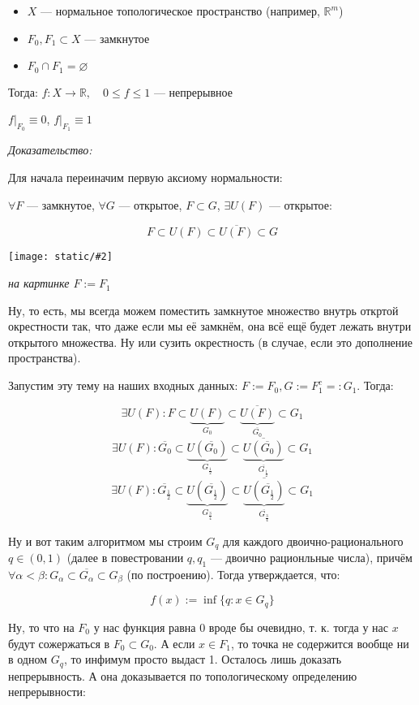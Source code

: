 \documentclass{article}
\def\images#1#2{\begin{center}\texttt{[image: static/\#2]}\end{center}}
\begin{document}
\begin{itemize}
    \item $X$ --- нормальное топологическое пространство (например, $\mathbb{R}^m$)
    \item $F_0, F_1 \subset X$ --- замкнутое
    \item $F_0 \cap F_1 = \varnothing$
\end{itemize}

Тогда: $f: X \rightarrow \mathbb{R}, \quad 0 \le f \le 1$ --- непрерывное

$f|_{F_0} \equiv 0$, $f|_{F_1} \equiv 1$

\textit{Доказательство:}

Для начала переиначим первую аксиому нормальности: 

$\forall F$ --- замкнутое, $\forall G$ --- открытое, $F \subset G$, $\exists U(F)$ --- открытое: 

\[F \subset U(F) \subset \overline{U(F)} \subset G\]

\images{0.5}{uryhson.jpg}

\textit{на картинке $F := F_1$}

Ну, то есть, мы всегда можем поместить замкнутое множество внутрь откртой окрестности так, что даже если мы её замкнём, она всё ещё будет лежать внутри открытого множества. Ну или сузить окрестность (в случае, если это дополнение пространства).

Запустим эту тему на наших входных данных: $F := F_0, G := F^c_1 =: G_1$. Тогда:

\[\exists U(F): F \subset \underbrace{U(F)}_{G_0} \subset \underbrace{\overline{U(F)}}_{\overline{G_0}} \subset G_1\]
\[\exists U(F): \overline{G_0} \subset \underbrace{U(\overline{G_0})}_{G_{\frac{1}{2}}} \subset \underbrace{\overline{U(\overline{G_0})}}_{\overline{G_{\frac{1}{2}}}} \subset G_1\]
\[\exists U(F): \overline{G_{\frac{1}{2}}} \subset \underbrace{U(\overline{G_{\frac{1}{2}}})}_{G_{\frac{3}{4}}} \subset \underbrace{\overline{U(\overline{G_{\frac{1}{2}}})}}_{\overline{G_{\frac{3}{4}}}} \subset G_1\]

Ну и вот таким алгоритмом мы строим $G_q$ для каждого двоично-рационального $q \in (0, 1)$ (далее в повестровании $q, q_1$ --- двоично рационльные числа), причём $\forall \alpha < \beta: G_{\alpha} \subset \overline{G_{\alpha}} \subset G_{\beta}$ (по построению). Тогда утверждается, что:

\[f(x) := \inf \{q: x \in G_q\}\]

Ну, то что на $F_0$ у нас функция равна 0 вроде бы очевидно, т. к. тогда у нас $x$ будут сожержаться в $F_0 \subset G_0$. А если $x \in F_1$, то точка не содержится вообще ни в одном $G_q$, то инфимум просто выдаст 1. Осталось лишь доказать непрерывность. А она доказывается по топологическому определению непрерывности:
\end{document}
